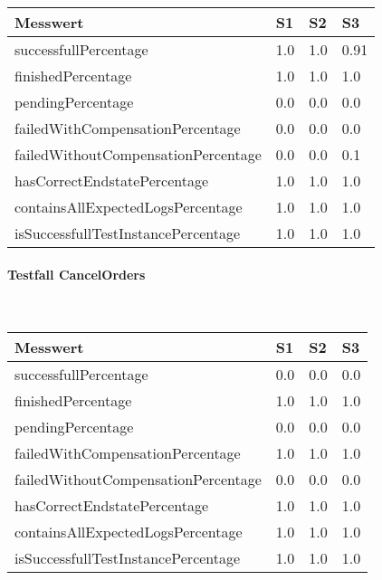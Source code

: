 \begin{center}
	\fontsize{9}{12}\selectfont
	\begin{longtable}[h]{|p{5cm}|p{1cm}|p{1cm}|p{1cm}|}
		\hline
		Messwert & S1 & S2 & S3 \\ \hline
		\endhead
		\endfoot
		successfull\-Percentage & 1.0 & 1.0 & 0.91 \\ \hline
		finished\-Percentage & 1.0 & 1.0 & 1.0 \\ \hline
		pending\-Percentage & 0.0 & 0.0 & 0.0 \\ \hline
		failedWithCompensation\-Percentage & 0.0 & 0.0 & 0.0 \\ \hline
		failedWithoutCompensation\-Percentage & 0.0 & 0.0 & 0.1 \\ \hline
		hasCorrectEndstate\-Percentage & 1.0 & 1.0 & 1.0 \\ \hline
		containsAllExpectedLogs\-Percentage & 1.0 & 1.0 & 1.0 \\ \hline
		isSuccessfullTestInstance\-Percentage & 1.0 & 1.0 & 1.0 \\ \hline
	\end{longtable}
\end{center}
\FloatBarrier

\paragraph*{Testfall CancelOrders} \mbox{}\\

\begin{center}
	\fontsize{9}{12}\selectfont
	\begin{longtable}[h]{|p{5cm}|p{1cm}|p{1cm}|p{1cm}|}
		\hline
		Messwert & S1 & S2 & S3 \\ \hline
		\endhead
		\endfoot
		successfull\-Percentage & 0.0 & 0.0 & 0.0 \\ \hline
		finished\-Percentage & 1.0 & 1.0 & 1.0 \\ \hline
		pending\-Percentage & 0.0 & 0.0 & 0.0 \\ \hline
		failedWithCompensation\-Percentage & 1.0 & 1.0 & 1.0 \\ \hline
		failedWithoutCompensation\-Percentage & 0.0 & 0.0 & 0.0 \\ \hline
		hasCorrectEndstate\-Percentage & 1.0 & 1.0 & 1.0 \\ \hline
		containsAllExpectedLogs\-Percentage & 1.0 & 1.0 & 1.0 \\ \hline
		isSuccessfullTestInstance\-Percentage & 1.0 & 1.0 & 1.0 \\ \hline
	\end{longtable}
\end{center}
\FloatBarrier

